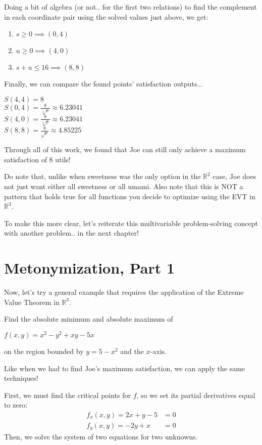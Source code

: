 \pagebreak
Doing a bit of algebra (or not.. for the first two relations) to find the complement in each coordinate pair using the solved values just above, we get:
\begin{enumerate}
	\item $s\geq 0\implies (0, 4)$
	\item $u\geq 0\implies (4, 0)$
	\item $s+u\leq 16\implies (8, 8)$
\end{enumerate}
Finally, we can compare the found points' satisfaction outputs...
\begin{center}
	$S(4, 4) = 8$\\
	$S(0, 4) = \frac{8}{\sqrt[4]{e}}\approx 6.23041$\\
	$S(4, 0) = \frac{8}{\sqrt[4]{e}}\approx 6.23041$\\
	$S(8, 8) = \frac{8}{\sqrt{e}}\approx 4.85225$
\end{center}

Through all of this work, we found that Joe can still only achieve a maximum satisfaction of $8$ utils!

Do note that, unlike when sweetness was the only option in the $\mathbb{R}^2$ case, Joe does not just want either all sweetness or all umami.
Also note that this is NOT a pattern that holds true for all functions you decide to optimize using the EVT in $\mathbb{R}^3$.

To make this more clear, let's reiterate this multivariable problem-solving concept with another problem.. in the next chapter!
\setcounter{chapter}{4}
\chapter{Metonymization, Part 1}
Now, let's try a general example that requires the application of the Extreme Value Theorem in $\mathbb{R}^3$.
\begin{eg}
	Find the absolute minimum and absolute maximum of
	\begin{center}
		$f(x, y) = x^2 - y^2 + xy - 5x$
	\end{center}
	on the region bounded by $y = 5 - x^2$ and the $x$-axis.
\end{eg}

Like when we had to find Joe's maximum satisfaction, we can apply the same techniques!

First, we must find the critical points for $f$, so we set its partial derivatives equal to zero:
\begin{align*}
	f_x(x,y)=2x+y-5&=0\\
	f_y(x,y)=-2y+x&=0
\end{align*}
Then, we solve the system of two equations for two unknowns.

